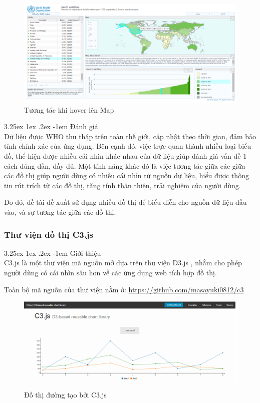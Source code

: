 \documentclass[12pt,a4paper,twoside]{article}
\makeatletter
\newcommand{\myparagraph}[1]{\paragraph{#1}\mbox{}\\} %
\renewcommand\paragraph{\@startsection{paragraph}{5}{\z@}%
  {3.25ex \@plus1ex \@minus.2ex}%
  {-1em}%
  {\normalfont\normalsize\bfseries}}
\makeatother
\begin{document}
\begin{figure}[!h]
    \begin{center}
    \includegraphics[scale=.4]{image/hoveratlas}
    \caption{Tương tác khi hover lên Map}
    \label{fig:hoveratlas}
    \end{center}
\end{figure}

\myparagraph{Đánh giá}
Dữ liệu được WHO thu thập trên toàn thế giới, cập nhật theo thời gian, đảm bảo tính chính xác của ứng dụng. Bên cạnh đó, việc trực quan thành nhiều loại biểu đồ, thể hiện được nhiều cái nhìn khác nhau của dữ liệu giúp đánh giá vấn đề 1 cách đúng đắn, đầy đủ. Một tính năng khác đó là việc tương tác giữa các giữa các đồ thị giúp người dùng có nhiều cái nhìn từ nguồn dữ liệu, hiểu được thông tin rút trích từ các đồ thị, tăng tính thân thiện, trải nghiệm của người dùng.

Do đó, đề tài đề xuất sử dụng nhiều đồ thị để biểu diễn cho nguồn dữ liệu đầu vào, và sự tương tác giữa các đồ thị.
\subsubsection{Thư viện đồ thị C3.js}\label{sec:c3js}
\myparagraph{Giới thiệu}
C3.js là một thư viện mã nguồn mở \cite{c3js} dựa trên thư viện D3.js , nhằm cho phép người dùng có cái nhìn sâu hơn về các ứng dụng web tích hợp đồ thị.

Toàn bộ mã nguồn của thư viện nằm ở: \url{https://github.com/masayuki0812/c3}
\begin{figure}[!h]
	\begin{center}
    \includegraphics[scale=.4]{image/c3js}
    \caption{Đồ thị đường tạo bởi C3.js}
    \label{fig:c3js}
	\end{center}
\end{figure}
\end{document}
